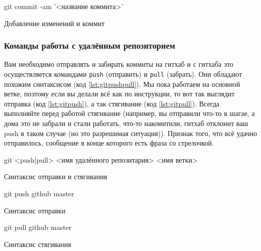 \documentclass[12pt]{article}
\begin{document}
\begin{listing}[H]
\begin{center}
\begin{bashcode}
git commit -am '<название коммита>'
\end{bashcode}
\end{center}
\caption{Добавление изменений и коммит}
\label{lst:gitcommitam}
\end{listing}

\subsubsection{Команды работы с удалённым репозиторием}
Вам необходимо отправлять и забирать коммиты на гитхаб и с гитхаба это осуществляется командами \verb|push| (отправить) и \verb|pull| (забрать). Они обладают похожим синтаксисом (код \ref{lst:gitpushpull}). Мы пока работаем на основной ветке, поэтому если вы делали всё как по инструкции, то вот так выглядит отправка (код \ref{lst:gitpush}), а так стягивание (код \ref{lst:gitpull}). Всегда выполняйте перед работой стягивание (например, вы отправили что-то в шагае, а дома это не забрали и стали работать, что-то накомитили, гитхаб отклонит ваш push в таком случае (но это разрешимая ситуация)). Признак того, что всё удачно отправилось, сообщение в конце которого есть фраза со стрелочкой.

\begin{listing}[H]
\begin{center}
\begin{bashcode}
git <push|pull> <имя удалённого репозитария> <имя ветки>
\end{bashcode}
\end{center}
\caption{Синтаксис отправки и стягивания}
\label{lst:gitpushpull}
\end{listing}

\begin{listing}[H]
\begin{center}
\begin{bashcode}
git push github master
\end{bashcode}
\end{center}
\caption{Синтаксис отправки}
\label{lst:gitpush}
\end{listing}

\begin{listing}[H]
\begin{center}
\begin{bashcode}
git pull github master
\end{bashcode}
\end{center}
\caption{Синтаксис стягивания}
\label{lst:gitpull}
\end{listing}
\end{document}
